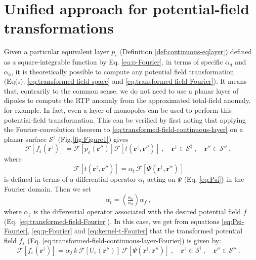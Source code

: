 \section{Unified approach for potential-field transformations}

Given a particular equivalent layer $p_{\varepsilon}$ (Definition \ref{def:continuous-eqlayer}) 
defined as a square-integrable function by Eq. \ref{eq:p-Fourier}, in terms of specific $\alpha_{d}$ and $\alpha_{a}$, 
it is theoretically possible to compute any potential field transformation (Eq(s). \ref{eq:transformed-field-space} and 
\ref{eq:transformed-field-Fourier}).
It means that, contrarily to the common sense, we do not need to use a planar layer of dipoles to compute the RTP anomaly from 
the approximated total-field anomaly, for example. In fact, even a layer of monopoles can be used to perform this potential-field transformation. 
This can be verified by first noting that applying the Fourier-convolution theorem to \ref{eq:transformed-field-continuous-layer} 
on a planar surface $\mathcal{S}^{\ddagger}$ (Fig.\ref{fig:Figure1}) gives
\begin{equation}
	\mathcal{F} [ f_{\varepsilon}(\mathbf{r}^{\ddagger}) ] =
	\mathcal{F} \left[ p_{\varepsilon}(\mathbf{r}'') \right]
	\mathcal{F} [ t(\mathbf{r}^{\ddagger}, \mathbf{r}'') ] \: , 
	\quad \mathbf{r}^{\ddagger} \in \mathcal{S}^{\ddagger} \: ,
	\quad \mathbf{r}'' \in \mathcal{S}'' \: ,
	\label{eq:transformed-field-continuous-layer-Fourier}
\end{equation}
where
\begin{equation}
	\mathcal{F} [ t(\mathbf{r}^{\ddagger}, \mathbf{r}'') ] = \alpha_{t} \, \mathcal{F} [ \Psi(\mathbf{r}^{\ddagger}, \mathbf{r}'') ]
	\label{eq:kernel-t-Fourier}
\end{equation}
is defined in terms of a differential operator $\alpha_{t}$ acting on $\Psi$ (Eq. \ref{eq:Psi}) in the Fourier domain.
Then we set 
\begin{equation}
	\alpha_{t} = \left( \tfrac{\alpha_{a}}{\alpha_{d}} \right) \alpha_{f} \: ,
	\label{eq:alpha-t-generic}
\end{equation}
where $\alpha_{f}$ is the differential operator associated with the desired potential field $f$ (Eq. \ref{eq:transformed-field-Fourier}).
In this case, we get from equations \ref{eq:Psi-Fourier}, \ref{eq:p-Fourier}  and \ref{eq:kernel-t-Fourier} 
that the transformed potential field $f_{\varepsilon}$ (Eq. \ref{eq:transformed-field-continuous-layer-Fourier}) 
is given by:
\begin{equation}
	\mathcal{F} [ f_{\varepsilon}(\mathbf{r}^{\ddagger}) ] =
	\alpha_{f} \, k \, \mathcal{F} [ U_{\varepsilon}(\mathbf{r}'') ] \: 
	\mathcal{F} [ \Psi(\mathbf{r}^{\ddagger}, \mathbf{r}'') ] \: , 
	\quad \mathbf{r}^{\ddagger} \in \mathcal{S}^{\ddagger} \: ,
	\quad \mathbf{r}'' \in \mathcal{S}'' \: .
	\label{eq:transformed-field-continuous-layer-Fourier2}
\end{equation}
